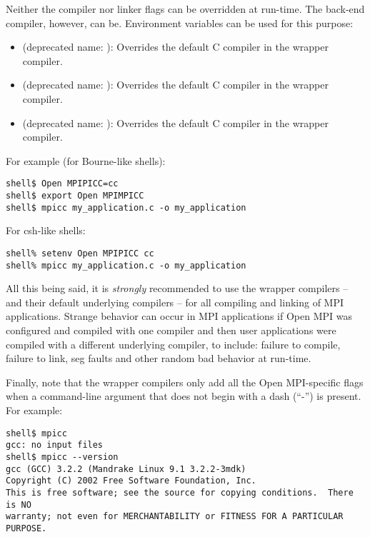 Neither the compiler nor linker flags can be overridden at run-time.
The back-end compiler, however, can be.  Environment variables can be
used for this purpose:

\begin{itemize}
\item {} (deprecated name: ):
  Overrides the default C compiler in the  wrapper
  compiler.
  
\item {} (deprecated name: ):
  Overrides the default C compiler in the  wrapper
  compiler.

\item {} (deprecated name: ):
  Overrides the default C compiler in the  wrapper
  compiler.
\end{itemize}

For example (for Bourne-like shells):

\lstset{style=lam-cmdline}
\begin{lstlisting}
shell$ Open MPIPICC=cc
shell$ export Open MPIMPICC
shell$ mpicc my_application.c -o my_application
\end{lstlisting}

For csh-like shells:

\lstset{style=lam-cmdline}
\begin{lstlisting}
shell% setenv Open MPIPICC cc
shell% mpicc my_application.c -o my_application
\end{lstlisting}

All this being said, it is {\em strongly} recommended to use the
wrapper compilers -- and their default underlying compilers -- for all
compiling and linking of MPI applications.  Strange behavior can occur
in MPI applications if Open MPI was configured and compiled with one
compiler and then user applications were compiled with a different
underlying compiler, to include: failure to compile, failure to link,
seg faults and other random bad behavior at run-time.

Finally, note that the wrapper compilers only add all the
Open MPI-specific flags when a command-line argument that does not
begin with a dash (``-'') is present.  For example:

\lstset{style=lam-cmdline}
\begin{lstlisting}
shell$ mpicc
gcc: no input files
shell$ mpicc --version
gcc (GCC) 3.2.2 (Mandrake Linux 9.1 3.2.2-3mdk)
Copyright (C) 2002 Free Software Foundation, Inc.
This is free software; see the source for copying conditions.  There is NO
warranty; not even for MERCHANTABILITY or FITNESS FOR A PARTICULAR PURPOSE.
\end{lstlisting}

